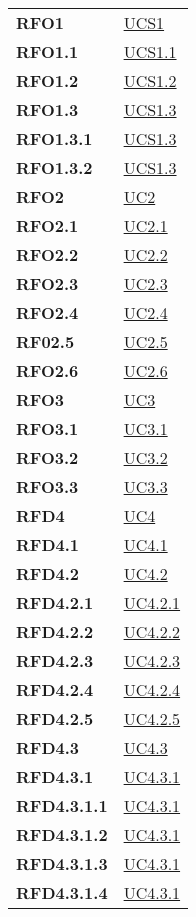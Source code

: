 \begin{longtable}[H]{|>{\centering\bfseries}m{8cm} | >{\centering\arraybackslash}m{8cm} |}
    RFO1 & \hyperref[sub:ucs1]{UCS1} \\
    RFO1.1 & \hyperref[ssub:ucs1.1]{UCS1.1} \\
    RFO1.2 & \hyperref[ssub:ucs1.2]{UCS1.2} \\
    RFO1.3 & \hyperref[ssub:ucs1.3]{UCS1.3} \\
    RFO1.3.1 & \hyperref[par:ucs1.3]{UCS1.3} \\
	RFO1.3.2 & \hyperref[par:ucs1.3]{UCS1.3} \\
    RFO2 & \hyperref[sub:uc2]{UC2} \\
    RFO2.1 & \hyperref[ssub:uc2.1]{UC2.1} \\
    RFO2.2 & \hyperref[ssub:uc2.2]{UC2.2} \\
    RFO2.3 & \hyperref[ssub:uc2.3]{UC2.3} \\
    RFO2.4 & \hyperref[ssub:uc2.4]{UC2.4} \\
    RF02.5 & \hyperref[ssub:uc2.5]{UC2.5} \\
    RFO2.6 & \hyperref[ssub:uc2.6]{UC2.6} \\
    RFO3 & \hyperref[sub:uc3]{UC3} \\
    RFO3.1 & \hyperref[ssub:uc3.1]{UC3.1} \\
    RFO3.2 & \hyperref[ssub:uc3.2]{UC3.2} \\
    RFO3.3 & \hyperref[ssub:uc3.3]{UC3.3} \\
    RFD4 & \hyperref[sub:uc4]{UC4} \\
    RFD4.1 & \hyperref[ssub:uc4.1]{UC4.1} \\
    RFD4.2 & \hyperref[ssub:uc4.2]{UC4.2} \\
    RFD4.2.1 & \hyperref[par:uc4.2.1]{UC4.2.1} \\
    RFD4.2.2 & \hyperref[par:uc4.2.2]{UC4.2.2} \\
    RFD4.2.3 & \hyperref[par:uc4.2.3]{UC4.2.3} \\
    RFD4.2.4 & \hyperref[par:uc4.2.4]{UC4.2.4} \\
    RFD4.2.5 & \hyperref[par:uc4.2.5]{UC4.2.5} \\
    RFD4.3 & \hyperref[ssub:uc4.3]{UC4.3} \\
    RFD4.3.1 & \hyperref[par:uc4.3.1]{UC4.3.1} \\
    RFD4.3.1.1 & \hyperref[par:uc4.3.1]{UC4.3.1} \\
    RFD4.3.1.2 & \hyperref[par:uc4.3.1]{UC4.3.1} \\
    RFD4.3.1.3 & \hyperref[par:uc4.3.1]{UC4.3.1} \\
    RFD4.3.1.4 & \hyperref[par:uc4.3.1]{UC4.3.1} \\

\end{longtable}
